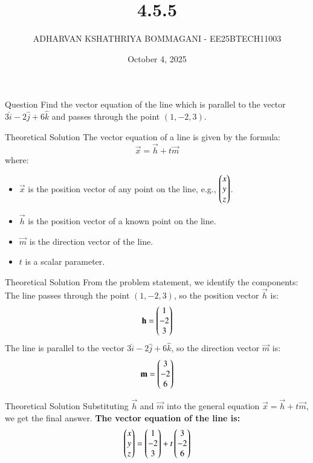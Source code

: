 \documentclass{beamer}
\title{4.5.5}
\date{October 4, 2025}
\author{ADHARVAN KSHATHRIYA BOMMAGANI - EE25BTECH11003}
\begin{document}
\frame{\titlepage}

\begin{frame}{Question}
Find the vector equation of the line which is parallel to the vector $3\hat{i} - 2\hat{j} + 6\hat{k}$ and passes through the point $(1, -2, 3)$.
\end{frame}

\begin{frame}{Theoretical Solution}
The vector equation of a line is given by the formula:
$$ \vec{x} = \vec{h} + t\vec{m} $$
where:
\begin{itemize}
    \item \textbf{$\vec{x}$} is the position vector of any point on the line, e.g., $\begin{pmatrix}x \\ y \\ z\end{pmatrix}$.
    \bigskip
    \item \textbf{$\vec{h}$} is the position vector of a known point on the line.
    \bigskip
    \item \textbf{$\vec{m}$} is the direction vector of the line.
    \bigskip
    \item \textbf{$t$} is a scalar parameter.
\end{itemize}
\end{frame}

\begin{frame}{Theoretical Solution}
From the problem statement, we identify the components:
\bigskip
The line passes through the point $(1, -2, 3)$, so the position vector \textbf{$\vec{h}$} is:
\begin{align*}
\mathbf{h} = \begin{pmatrix}1 \\ -2 \\ 3\end{pmatrix}
\end{align*}
\bigskip
The line is parallel to the vector $3\hat{i} - 2\hat{j} + 6\hat{k}$, so the direction vector \textbf{$\vec{m}$} is:
\begin{align*}
\mathbf{m} = \begin{pmatrix}3 \\ -2 \\ 6\end{pmatrix}
\end{align*}
\end{frame}

\begin{frame}{Theoretical Solution}
Substituting $\vec{h}$ and $\vec{m}$ into the general equation $\vec{x} = \vec{h} + t\vec{m}$, we get the final answer.
\bigskip
\textbf{The vector equation of the line is:}
\begin{align*}
\begin{pmatrix}x \\ y \\ z\end{pmatrix} = \begin{pmatrix}1 \\ -2 \\ 3\end{pmatrix} + t \begin{pmatrix}3 \\ -2 \\ 6\end{pmatrix}
\end{align*}
\end{frame}
\end{document}
